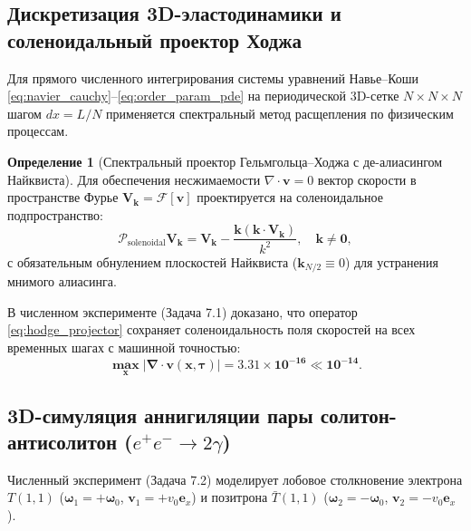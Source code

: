 \documentclass[11pt,a4paper,oneside]{article}
\theoremstyle{plain}
\theoremstyle{definition}
\newtheorem{definition}{Определение}[section]
\theoremstyle{remark}
\numberwithin{equation}{section}
\begin{document}
\subsection{Дискретизация 3D-эластодинамики и соленоидальный проектор Ходжа}

Для прямого численного интегрирования системы уравнений Навье--Коши \eqref{eq:navier_cauchy}--\eqref{eq:order_param_pde} на периодической 3D-сетке $N \times N \times N$ шагом $dx = L/N$ применяется спектральный метод расщепления по физическим процессам.

\begin{definition}[Спектральный проектор Гельмгольца--Ходжа с де-алиасингом Найквиста]
Для обеспечения несжимаемости $\nabla \cdot \mathbf{v} = 0$ вектор скорости в пространстве Фурье $\mathbf{V}_{\mathbf{k}} = \mathcal{F}[\mathbf{v}]$ проектируется на соленоидальное подпространство:
\begin{equation}
	\mathcal{P}_{\text{solenoidal}} \mathbf{V}_{\mathbf{k}} = \mathbf{V}_{\mathbf{k}} - \frac{\mathbf{k}(\mathbf{k} \cdot \mathbf{V}_{\mathbf{k}})}{k^2}, \quad \mathbf{k} \neq \mathbf{0},
	\label{eq:hodge_projector}
\end{equation}
с обязательным обнулением плоскостей Найквиста ($\mathbf{k}_{N/2} \equiv 0$) для устранения мнимого алиасинга.
\end{definition}

В численном эксперименте (Задача 7.1) доказано, что оператор \eqref{eq:hodge_projector} сохраняет соленоидальность поля скоростей на всех временных шагах с машинной точностью:
\begin{equation}
\mathbf{\max_{\mathbf{x}} |\nabla \cdot \mathbf{v}(\mathbf{x}, \tau)| = \mathbf{3.31 \times 10^{-16} \ll 10^{-14}}}.
\end{equation}

\subsection{3D-симуляция аннигиляции пары солитон-антисолитон ($e^+ e^- \to 2\gamma$)}

Численный эксперимент (Задача 7.2) моделирует лобовое столкновение электрона $T(1,1)$ ($\boldsymbol{\omega}_1 = +\boldsymbol{\omega}_0$, $\mathbf{v}_1 = +v_0 \mathbf{e}_x$) и позитрона $\bar{T}(1,1)$ ($\boldsymbol{\omega}_2 = -\boldsymbol{\omega}_0$, $\mathbf{v}_2 = -v_0 \mathbf{e}_x$).
\end{document}
